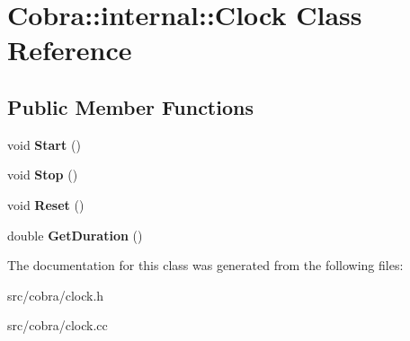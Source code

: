\hypertarget{class_cobra_1_1internal_1_1_clock}{\section{Cobra\+:\+:internal\+:\+:Clock Class Reference}
\label{class_cobra_1_1internal_1_1_clock}
}
\subsection*{Public Member Functions}
\begin{DoxyCompactItemize}
\item 
\hypertarget{class_cobra_1_1internal_1_1_clock_a6b720b9135af9ffae9d2a1283b9e6867}{void {\bfseries Start} ()}\label{class_cobra_1_1internal_1_1_clock_a6b720b9135af9ffae9d2a1283b9e6867}

\item 
\hypertarget{class_cobra_1_1internal_1_1_clock_ae9829bc4afa5a59007ea88bd2f0d54bf}{void {\bfseries Stop} ()}\label{class_cobra_1_1internal_1_1_clock_ae9829bc4afa5a59007ea88bd2f0d54bf}

\item 
\hypertarget{class_cobra_1_1internal_1_1_clock_ad6abe06abf100cd64c6b61ac450686cd}{void {\bfseries Reset} ()}\label{class_cobra_1_1internal_1_1_clock_ad6abe06abf100cd64c6b61ac450686cd}

\item 
\hypertarget{class_cobra_1_1internal_1_1_clock_a337417db217baf41dc732b537dae1ec2}{double {\bfseries Get\+Duration} ()}\label{class_cobra_1_1internal_1_1_clock_a337417db217baf41dc732b537dae1ec2}

\end{DoxyCompactItemize}


The documentation for this class was generated from the following files\+:\begin{DoxyCompactItemize}
\item 
src/cobra/clock.\+h\item 
src/cobra/clock.\+cc\end{DoxyCompactItemize}
